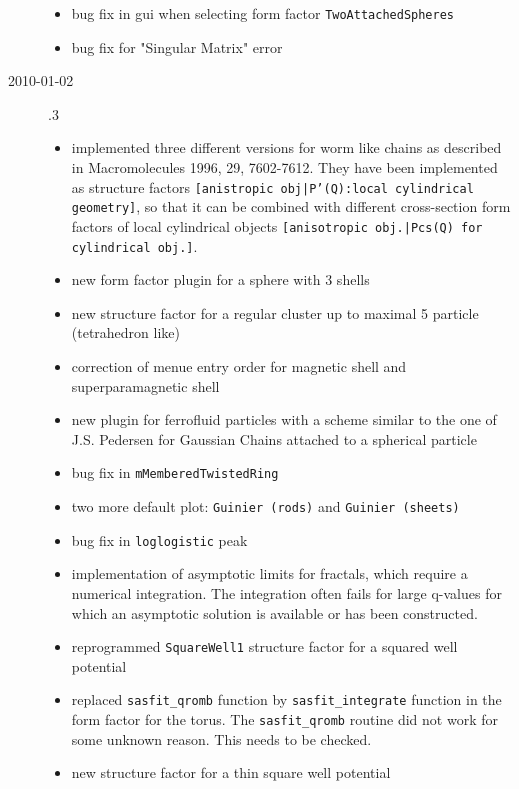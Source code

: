 \begin{description}
\begin{itemize}
            \item bug fix in gui when selecting form factor \texttt{TwoAttachedSpheres}
            \item bug fix for "Singular Matrix" error
        \end{itemize}
    \item[2010-01-02] .3
        \begin{itemize}
        \item implemented three different versions for worm like chains as
              described in Macromolecules 1996, 29, 7602-7612. They have
              been implemented as structure factors
              \texttt{[anistropic obj|P'(Q):local cylindrical geometry]},
              so that it can be combined with different cross-section
              form factors of local cylindrical objects
              \texttt{[anisotropic obj.|Pcs(Q) for cylindrical obj.]}.
        \item new form factor plugin for a sphere with 3 shells
        \item new structure factor for a regular cluster up to maximal 5 particle
              (tetrahedron like)
        \item correction of menue entry order for magnetic shell and
              superparamagnetic shell
        \item new plugin for ferrofluid particles with a scheme similar to
              the one of J.S. Pedersen for Gaussian Chains attached to a spherical particle
        \item bug fix in \texttt{mMemberedTwistedRing}
        \item two more default plot: \texttt{Guinier (rods)} and \texttt{Guinier (sheets)}
        \item bug fix in \texttt{loglogistic} peak
        \item implementation of asymptotic limits for fractals, which require a
              numerical integration. The integration often fails for large q-values
              for which an asymptotic solution is available or has been constructed.
        \item reprogrammed \texttt{SquareWell1} structure factor for a squared well potential
        \item replaced \texttt{sasfit\_qromb} function by \texttt{sasfit\_integrate} function in the
              form factor for the torus. The \texttt{sasfit\_qromb} routine did not work for some
              unknown reason. This needs to be checked.
        \item new structure factor for a thin square well potential

\end{itemize}
\end{description}
